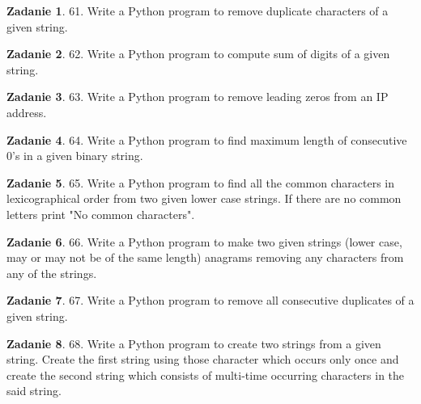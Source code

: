 \documentclass[11pt]{article}
\theoremstyle{definition}
\newtheorem{zadanie}{Zadanie}
\begin{document}
\begin{zadanie}


61. Write a Python program to remove duplicate characters of a given string. 

\end{zadanie}

\begin{zadanie}


62. Write a Python program to compute sum of digits of a given string. 

\end{zadanie}

\begin{zadanie}


63. Write a Python program to remove leading zeros from an IP address. 

\end{zadanie}

\begin{zadanie}


64. Write a Python program to find maximum length of consecutive 0's in a given binary string. 

\end{zadanie}

\begin{zadanie}


65. Write a Python program to find all the common characters in lexicographical order from two given lower case strings. If there are no common letters print "No common characters". 

\end{zadanie}

\begin{zadanie}


66. Write a Python program to make two given strings (lower case, may or may not be of the same length) anagrams removing any characters from any of the strings. 

\end{zadanie}

\begin{zadanie}


67. Write a Python program to remove all consecutive duplicates of a given string. 

\end{zadanie}

\begin{zadanie}


68. Write a Python program to create two strings from a given string. Create the first string using those character which occurs only once and create the second string which consists of multi-time occurring characters in the said string. 

\end{zadanie}
\end{document}
